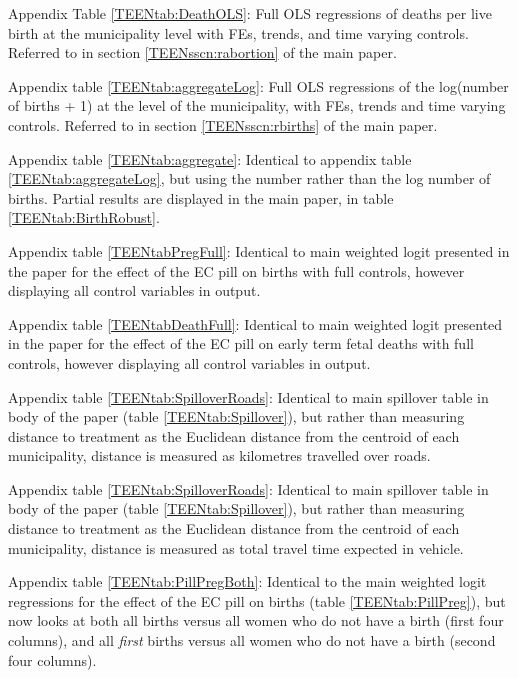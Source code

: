 \documentclass[11pt,subeqn]{article}
\begin{document}
\begin{spacing}{1.4}
\noindent Appendix Table \ref{TEENtab:DeathOLS}: Full OLS regressions 
of deaths per live birth at the municipality level with FEs, trends,
and time varying controls.  Referred to in section 
\ref{TEENsscn:rabortion} of the main paper.

\noindent Appendix table \ref{TEENtab:aggregateLog}: Full OLS regressions 
of the log(number of births + 1) at the level of the municipality, with
FEs, trends and time varying controls.  Referred to in section 
\ref{TEENsscn:rbirths} of the main paper.

\noindent Appendix table \ref{TEENtab:aggregate}: Identical to appendix
table \ref{TEENtab:aggregateLog}, but using the number rather than the log
number of births.  Partial results are displayed in the main paper, in 
table \ref{TEENtab:BirthRobust}.

\noindent Appendix table \ref{TEENtabPregFull}: Identical to main weighted
logit presented in the paper for the effect of the EC pill on births with 
full controls, however displaying all control variables in output.

\noindent Appendix table \ref{TEENtabDeathFull}: Identical to main weighted
logit presented in the paper for the effect of the EC pill on early term
fetal deaths with full controls, however displaying all control variables in 
output.

\noindent Appendix table \ref{TEENtab:SpilloverRoads}: Identical to main 
spillover table in body of the paper (table \ref{TEENtab:Spillover}), but 
rather than measuring distance to treatment as the Euclidean distance from 
the centroid of each municipality, distance is measured as kilometres 
travelled over roads.

\noindent Appendix table \ref{TEENtab:SpilloverRoads}: Identical to main 
spillover table in body of the paper (table \ref{TEENtab:Spillover}), but 
rather than measuring distance to treatment as the Euclidean distance from 
the centroid of each municipality, distance is measured as total travel time
expected in vehicle.

\noindent Appendix table \ref{TEENtab:PillPregBoth}: Identical to the
main weighted logit regressions for the effect of the EC pill on births
(table \ref{TEENtab:PillPreg}), but now looks at both all births versus 
all women who do not have a birth (first four columns), and all 
\emph{first} births versus all women who do not have a birth (second four 
columns).









\end{spacing}
\end{document}
